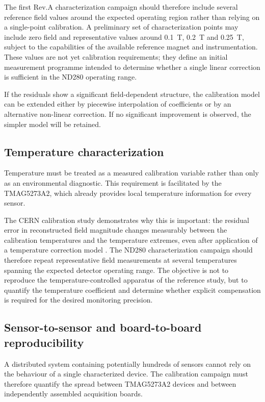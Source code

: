 The first Rev.A characterization campaign should therefore include several reference field values around the expected operating region rather than relying on a single-point calibration. A preliminary set of characterization points may include zero field and representative values around \SI{0.1}{T}, \SI{0.2}{T} and \SI{0.25}{T}, subject to the capabilities of the available reference magnet and instrumentation. These values are not yet calibration requirements; they define an initial measurement programme intended to determine whether a single linear correction is sufficient in the ND280 operating range.

If the residuals show a significant field-dependent structure, the calibration model can be extended either by piecewise interpolation of coefficients or by an alternative non-linear correction. If no significant improvement is observed, the simpler model will be retained.

\subsection{Temperature characterization}

Temperature must be treated as a measured calibration variable rather than only as an environmental diagnostic. This requirement is facilitated by the TMAG5273A2, which already provides local temperature information for every sensor.

The CERN calibration study demonstrates why this is important: the residual error in reconstructed field magnitude changes measurably between the calibration temperatures and the temperature extremes, even after application of a temperature correction model \cite{MessnerHallCalibration}. The ND280 characterization campaign should therefore repeat representative field measurements at several temperatures spanning the expected detector operating range. The objective is not to reproduce the temperature-controlled apparatus of the reference study, but to quantify the temperature coefficient and determine whether explicit compensation is required for the desired monitoring precision.

\subsection{Sensor-to-sensor and board-to-board reproducibility}

A distributed system containing potentially hundreds of sensors cannot rely on the behaviour of a single characterized device. The calibration campaign must therefore quantify the spread between TMAG5273A2 devices and between independently assembled acquisition boards.

